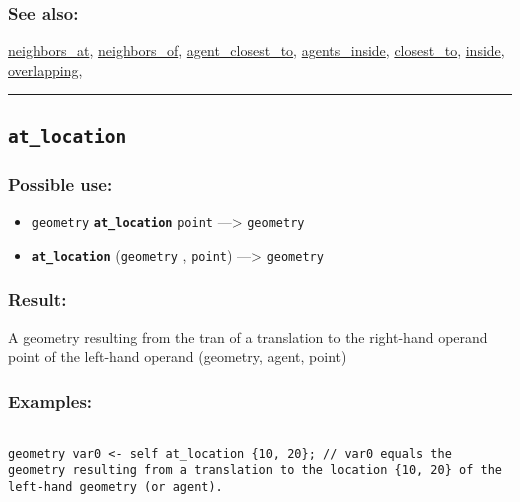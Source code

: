 \documentclass[]{book}
\providecommand{\tightlist}{%
  \setlength{\itemsep}{0pt}\setlength{\parskip}{0pt}}
\theoremstyle{definition}
\theoremstyle{definition}
\theoremstyle{definition}
\theoremstyle{remark}
\begin{document}
\subsubsection{See also:}\label{see-also-40}

\href{OperatorsNR\#neighbors_at}{neighbors\_at},
\href{OperatorsNR\#neighbors_of}{neighbors\_of},
\href{OperatorsAA\#agent_closest_to}{agent\_closest\_to},
\href{OperatorsAA\#agents_inside}{agents\_inside},
\href{OperatorsBC\#closest_to}{closest\_to},
\href{OperatorsIM\#inside}{inside},
\href{OperatorsNR\#overlapping}{overlapping},

\begin{center}\rule{0.5\linewidth}{\linethickness}\end{center}

\subsection{\texorpdfstring{\texttt{at\_location}}{at\_location}}\label{at_location}

\subsubsection{Possible use:}\label{possible-use-58}

\begin{itemize}
\tightlist
\item
  \texttt{geometry} \textbf{\texttt{at\_location}} \texttt{point}
  ---\textgreater{} \texttt{geometry}
\item
  \textbf{\texttt{at\_location}} (\texttt{geometry} , \texttt{point})
  ---\textgreater{} \texttt{geometry}
\end{itemize}

\subsubsection{Result:}\label{result-57}

A geometry resulting from the tran of a translation to the right-hand
operand point of the left-hand operand (geometry, agent, point)

\subsubsection{Examples:}\label{examples-48}

\begin{verbatim}
 
geometry var0 <- self at_location {10, 20}; // var0 equals the geometry resulting from a translation to the location {10, 20} of the left-hand geometry (or agent).
\end{verbatim}
\end{document}
